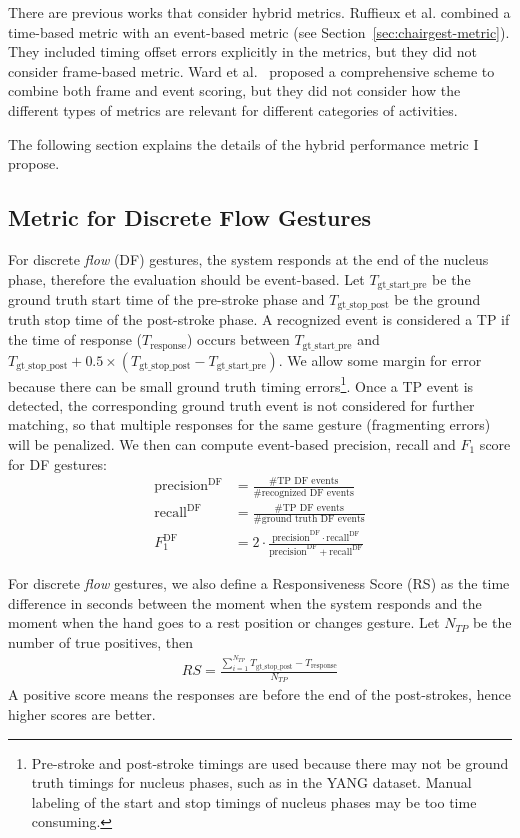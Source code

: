 There are previous works that consider
hybrid metrics. Ruffieux et al.
combined a time-based metric with an event-based metric (see
Section~\ref{sec:chairgest-metric}). They included timing offset errors
explicitly in the metrics, but they did not consider frame-based metric. Ward et
al.~\cite{ward11} proposed a comprehensive scheme to combine both frame and
event scoring, but they did not consider how the different types of metrics are
relevant for different categories of activities.

The following section explains the details of the hybrid performance metric I
propose.

\subsection{Metric for Discrete Flow Gestures}
For discrete \textit{flow} (DF) gestures, the system responds at the end of the
nucleus phase, therefore the evaluation should be event-based. Let
$T_{{\text{gt\_start\_pre}}}$ be the ground truth start time of the pre-stroke phase and
$T_{{\text{gt\_stop\_post}}}$ be the ground truth stop time of the post-stroke
phase.
A recognized event is considered a TP if the time of response ($T_{\text{response}}$) 
occurs between $T_{{\text{gt\_start\_pre}}}$ and $T_{{\text{gt\_stop\_post}}} +
0.5\times(T_{{\text{gt\_stop\_post}}} -
T_{\text{gt\_start\_pre}})$.
We allow some margin for error because there can be small ground truth timing errors\footnote{Pre-stroke and post-stroke
timings are used because there may not be ground truth timings for nucleus
phases, such as in the YANG dataset. Manual labeling of the start and stop
timings of nucleus phases may be too time consuming.}.
Once a TP event is detected, the corresponding ground truth event is not
considered for further matching, so that multiple responses for the same gesture
(fragmenting errors) will be penalized. We then can compute event-based
precision, recall and $F_1$ score for DF gestures:
\begin{align}
\text{precision}^{\text{DF}} &=\frac{\text{\# TP DF events}}{\text{\# recognized
DF events}}
\\
\text{recall}^{\text{DF}} &=\frac{\text{\# TP DF events}}{\text{\# ground truth
DF events}} \\
F_1^{\text{DF}} &= 2\cdot \frac{\text{precision}^{\text{DF}} \cdot
\text{recall}^{\text{DF}}}{\text{precision}^{\text{DF}} +
\text{recall}^{\text{DF}}}
\end{align}

For discrete \textit{flow} gestures, we also define a Responsiveness Score (RS)
as the time difference in seconds between the moment when the system responds and the moment when the hand goes to a rest
position or changes gesture. Let $N_{TP}$ be the number of true positives, then
\begin{align}
RS = \frac{\sum_{i = 1}^{N_{TP}}T_{{\text{gt\_stop\_post}}} -
T_{\text{response}}}{N_{TP}}\label{eqn:rs}
\end{align}
A positive score means the responses are before the end of the post-strokes,
hence higher scores are better.

